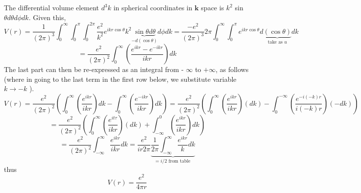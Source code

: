 The differential volume element $d^{3} k$ in spherical coordinates in $\mathbf{k}$ space is $k^{2}$ sin $\theta d \theta d \phi d k$. Given this, 
\begin{equation}V(r)=\frac{1}{(2 \pi)^{3}} \int_{0}^{\infty} \int_{0}^{\pi} \int_{0}^{2 \pi} \frac{e^{2}}{k^{2}} e^{i k r\cos \theta} k^{2} \underbrace{\sin \theta d \theta}_{-d(\cos \theta)} d \phi d k=\frac{-e^{2}}{(2 \pi)^{3}} 2 \pi \int_{0}^{\infty} \int_{0}^{\pi} e^{i k r \cos \theta} d \underbrace{(\cos \theta)}_{\text {take as } u} d k\end{equation}
$$=\frac{e^{2}}{(2 \pi)^{2}} \int_{0}^{\infty}\left(\frac{e^{i k r}-e^{-i k r}}{i k r}\right) d k$$
The last part can then be re-expressed as an integral from - $\infty$ to $+\infty$, as follows (where in going to the last term in the first row below, we substitute variable $k \rightarrow-k$ ).
$$V(r)=\frac{e^{2}}{(2 \pi)^{2}}\left(\int_{0}^{\infty}\left(\frac{e^{i kr}}{i k r}\right) d k-\int_{0}^{\infty}\left(\frac{e^{-i k r}}{i k r}\right) d k\right)=\frac{e^{2}}{(2 \pi)^{2}}\left(\int_{0}^{\infty}\left(\frac{e^{i k r}}{i k r}\right)(d k)-\int_{0}^{-\infty}\left(\frac{e^{-i(-k) r}}{i(-k) r}\right)(-d k)\right)$$
$$=\frac{e^{2}}{(2 \pi)^{2}}\left(\int_{0}^{\infty}\left(\frac{e^{i t \tau}}{i k r}\right)(d k)+\int_{-\infty}^{0}\left(\frac{e^{i k r}}{i k r}\right) d k\right)$$
$$=\frac{e^{2}}{(2 \pi)^{2}} \int_{-\infty}^{\infty} \frac{e^{i k r}}{i k r} d k=\frac{e^{2}}{i r 2 \pi} \underbrace{\frac{1}{2 \pi} \int_{-\infty}^{\infty} \frac{e^{i k r}}{k} d k}_{=i / 2 \text { from table }}$$
thus
\begin{equation}V(r)=\frac{e^{2}}{4 \pi r}\end{equation}

